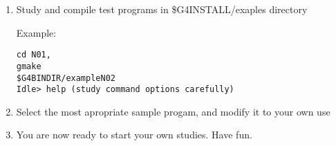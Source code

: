 \begin{enumerate}
\item Study and compile test programs in {\sf \$G4INSTALL/exaples} directory

Example: 
\begin{verbatim}
cd N01, 
gmake
$G4BINDIR/exampleN02
Idle> help (study command options carefully)
\end{verbatim}

\item Select the most apropriate sample progam, and modify it to your own use
\item You are now ready to start your own studies. Have fun. 

 \end{enumerate}                       


